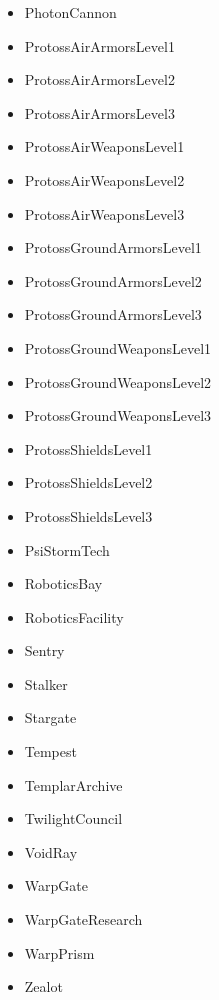 \begin{anexosenv}
\begin{multicols}{2}
\begin{itemize}
		\item PhotonCannon
		\item ProtossAirArmorsLevel1
		\item ProtossAirArmorsLevel2
		\item ProtossAirArmorsLevel3
		\item ProtossAirWeaponsLevel1
		\item ProtossAirWeaponsLevel2
		\item ProtossAirWeaponsLevel3
		\item ProtossGroundArmorsLevel1
		\item ProtossGroundArmorsLevel2
		\item ProtossGroundArmorsLevel3
		\item ProtossGroundWeaponsLevel1
		\item ProtossGroundWeaponsLevel2
		\item ProtossGroundWeaponsLevel3
		\item ProtossShieldsLevel1
		\item ProtossShieldsLevel2
		\item ProtossShieldsLevel3
		\item PsiStormTech
		\item RoboticsBay
		\item RoboticsFacility
		\item Sentry
		\item Stalker
		\item Stargate
		\item Tempest
		\item TemplarArchive
		\item TwilightCouncil
		\item VoidRay
		\item WarpGate
		\item WarpGateResearch
		\item WarpPrism
		\item Zealot
	\end{itemize}
\end{multicols}


%
%
%
%
%
%
%

\end{anexosenv}


